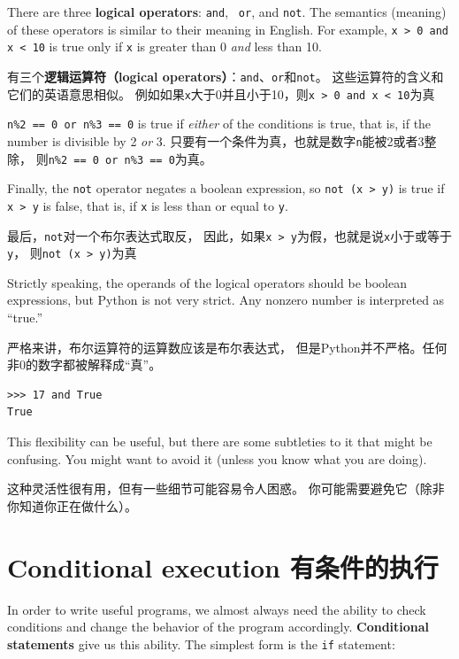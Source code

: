 \documentclass[10pt]{book}
\begin{document}
\begin{CJK}{UTF8}{gbsn}
There are three {\bf logical operators}: {\tt and}, {\tt
or}, and {\tt not}.  The semantics (meaning) of these operators is
similar to their meaning in English.  For example,
{\tt x > 0 and x < 10} is true only if {\tt x} is greater than 0
{\em and} less than 10.

有三个{\bf 逻辑运算符（logical operators）}：{\tt and}、{\tt or}和{\tt not}。
这些运算符的含义和它们的英语意思相似。
例如如果{\tt x}大于0并且小于10，则{\tt x > 0 and x < 10}为真

{\tt n\%2 == 0 or n\%3 == 0} is true if {\em either} of the conditions
is true, that is, if the number is divisible by 2 {\em or} 3.
只要有一个条件为真，也就是数字{\tt n}能被2或者3整除，
则{\tt n\%2 == 0 or n\%3 == 0}为真。

Finally, the {\tt not} operator negates a boolean
expression, so {\tt not (x > y)} is true if {\tt x > y} is false,
that is, if {\tt x} is less than or equal to {\tt y}.

最后，{\tt not}对一个布尔表达式取反，
因此，如果{\tt x > y}为假，也就是说{\tt x}小于或等于{\tt y}，
则{\tt not (x > y)}为真

Strictly speaking, the operands of the logical operators should be
boolean expressions, but Python is not very strict.
Any nonzero number is interpreted as ``true.''

严格来讲，布尔运算符的运算数应该是布尔表达式，
但是Python并不严格。任何非0的数字都被解释成``真''。

\begin{verbatim}
>>> 17 and True
True
\end{verbatim}
%
This flexibility can be useful, but there are some subtleties to
it that might be confusing.  You might want to avoid it (unless
you know what you are doing).

这种灵活性很有用，但有一些细节可能容易令人困惑。
你可能需要避免它（除非你知道你正在做什么）。


\section{Conditional execution 有条件的执行}
\label{conditional.execution}

In order to write useful programs, we almost always need the ability
to check conditions and change the behavior of the program
accordingly.  {\bf Conditional statements} give us this ability.  The
simplest form is the {\tt if} statement:


\end{CJK}
\end{document}
